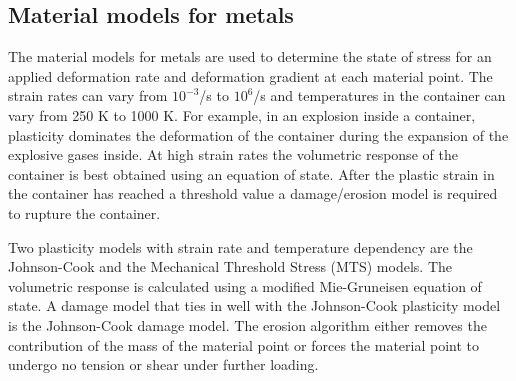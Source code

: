 \subsection{Material models for metals}
The material models for metals are used to determine
the state of stress  for an applied deformation
rate and deformation gradient at each material point.  The strain 
rates can vary from $10^{-3}$/s to $10^6$/s and temperatures in 
the container can vary from 250 K to 1000 K.  For example, in
an explosion inside a container, plasticity dominates
the deformation of the container during the expansion of the 
explosive gases inside.  At high strain rates the volumetric
response of the container is best obtained using an equation of 
state.  After the plastic strain in the container
has reached a threshold value a damage/erosion model is required to
rupture the container.

Two plasticity models with strain rate and temperature dependency 
are the Johnson-Cook and the Mechanical Threshold Stress (MTS) 
models.  The volumetric response is calculated using a modified
Mie-Gruneisen equation of state.  A damage model that ties in well 
with the Johnson-Cook plasticity model is the Johnson-Cook damage 
model.  The erosion algorithm either removes the contribution
of the mass of the material point or forces the material point
to undergo no tension or shear under further loading.

